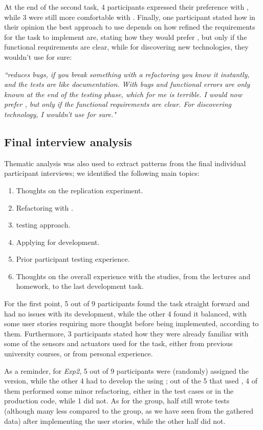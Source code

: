 At the end of the second task, 4 participants expressed their preference with \tdd, while 3 were still more comfortable with \notdd. Finally, one participant stated how in their opinion the best approach to use depends on how refined the requirements for the task to implement are, stating how they would prefer \tdd, but only if the functional requirements are clear, while for discovering new technologies, they wouldn't use \tdd for sure:
\begin{mdframed}
    \textit{``\tdd reduces bugs, if you break something with a refactoring you know it instantly, and the tests are like documentation. With \notdd bugs and functional errors are only known at the end of the testing phase, which for me is terrible. I would now prefer \tdd, but only if the functional requirements are clear. For discovering technology, I wouldn't use \tdd for sure."}
\end{mdframed}



\subsection{Final interview analysis}
Thematic analysis was also used to extract patterns from the final individual participant interviews; we identified the following main topics: 
\begin{enumerate}
    \item Thoughts on the replication experiment.
    \item Refactoring with \tdd.
    \item \notdd testing approach.
    \item Applying \tdd for \ess development.
    \item Prior participant testing experience.
    \item Thoughts on the overall experience with the studies, from the lectures and homework, to the last development task.
\end{enumerate}

For the first point, 5 out of 9 participants found the task straight forward and had no issues with its development, while the other 4 found it balanced, with some user stories requiring more thought before being implemented, according to them. Furthermore, 3 participants stated how they were already familiar with some of the sensors and actuators used for the task, either from previous university courses, or from personal experience.

As a reminder, for \textit{Exp2}, 5 out of 9 participants were (randomly) assigned the \tdd version, while the other 4 had to develop the \es using \notdd; out of the 5 that used \tdd, 4 of them performed some minor refactoring, either in the test cases or in the production code, while 1 did not.
As for the \notdd group, half still wrote tests (although many less compared to the \tdd group, as we have seen from the gathered data) after implementing the user stories, while the other half did not.

